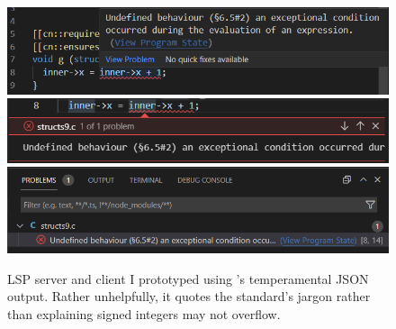 \begin{figure}[htp]
    \includegraphics{figures/lsp-structs9-hover.png}
    \includegraphics{figures/lsp-structs9-inline.png}
    \includegraphics{figures/lsp-structs9-problems.png}
    \caption{LSP server and client I prototyped using 's temperamental
    JSON output. Rather unhelpfully, it quotes the  standard's jargon
    rather than explaining signed integers may not overflow.}\label{fig:lsp-extra}
\end{figure}

